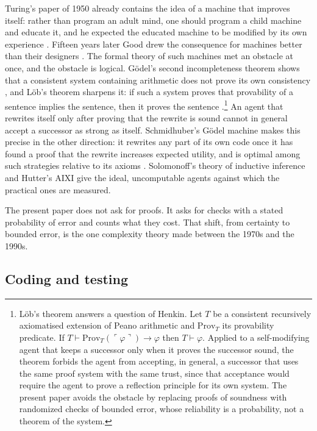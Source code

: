 Turing's paper of 1950 already contains the idea of a machine that improves itself: rather than program an adult mind, one should program a child machine and educate it, and he expected the educated machine to be modified by its own experience \cite{Tur50}. Fifteen years later Good drew the consequence for machines better than their designers \cite{Goo66}. The formal theory of such machines met an obstacle at once, and the obstacle is logical. G\"odel's second incompleteness theorem shows that a consistent system containing arithmetic does not prove its own consistency \cite{God31}, and L\"ob's theorem sharpens it: if such a system proves that provability of a sentence implies the sentence, then it proves the sentence \cite{Lob55}.\footnote{L\"ob's theorem answers a question of Henkin. Let $T$ be a consistent recursively axiomatised extension of Peano arithmetic and $\mathrm{Prov}_{T}$ its provability predicate. If $T\vdash\mathrm{Prov}_{T}(\ulcorner\varphi\urcorner)\to\varphi$ then $T\vdash\varphi$. Applied to a self-modifying agent that keeps a successor only when it proves the successor sound, the theorem forbids the agent from accepting, in general, a successor that uses the same proof system with the same trust, since that acceptance would require the agent to prove a reflection principle for its own system. The present paper avoids the obstacle by replacing proofs of soundness with randomized checks of bounded error, whose reliability is a probability, not a theorem of the system.} An agent that rewrites itself only after proving that the rewrite is sound cannot in general accept a successor as strong as itself. Schmidhuber's G\"odel machine makes this precise in the other direction: it rewrites any part of its own code once it has found a proof that the rewrite increases expected utility, and is optimal among such strategies relative to its axioms \cite{Sch03}. Solomonoff's theory of inductive inference \cite{Sol64} and Hutter's AIXI \cite{Hut05} give the ideal, uncomputable agents against which the practical ones are measured.

The present paper does not ask for proofs. It asks for checks with a stated probability of error and counts what they cost. That shift, from certainty to bounded error, is the one complexity theory made between the 1970s and the 1990s.

\subsection{Coding and testing}

